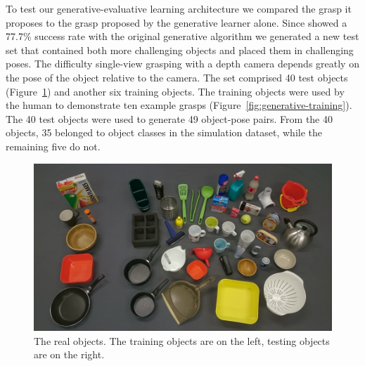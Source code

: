 
To test our generative-evaluative learning architecture we compared the grasp it proposes to the grasp proposed by the generative learner alone. Since \citet{kopicki2015ijrr} showed a 77.7\% success rate with the original generative algorithm we generated a new test set that contained both more challenging objects and placed them in challenging poses. The difficulty single-view grasping with a depth camera depends greatly on the pose of the object relative to the camera. The set comprised 40 test objects (Figure~\ref{fig:real-objects}) and another six training objects. The training objects were used by the human to demonstrate ten example grasps (Figure~\ref{fig:generative-training}). The 40 test objects were used to generate 49 object-pose pairs. From the 40 objects, 35 belonged to object classes in the simulation dataset, while the remaining five do not. 

\begin{figure}
  \includegraphics[width=\linewidth]{images/objects.jpg}
  \caption{The real objects. The training objects are on the left, testing objects are on the right.}
  \label{fig:real-objects}
\end{figure}

